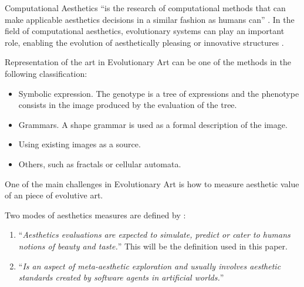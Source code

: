 \documentclass[conference]{IEEEtran}
\begin{document}
Computational Aesthetics ``is the research of computational methods that can make applicable aesthetics decisions in a similar fashion as humans can'' \cite{COMPAESTH}. In the field of computational aesthetics, evolutionary systems can play an important role, enabling the evolution of aesthetically pleasing or innovative structures \cite{dipaola2009incorporating}.


Representation of the art in Evolutionary Art can be one of the methods in the following classification:
\begin{itemize}
	\item Symbolic expression. The genotype is a tree of expressions and the phenotype consists in the image produced  by the evaluation of the tree.
	\item Grammars. A shape grammar is used as a formal description of the image.
	\item Using existing images as a source. 
	\item Others, such as fractals or cellular automata.
\end{itemize}

One of the main challenges in Evolutionary Art is how to measure aesthetic value of an piece of evolutive art.

Two modes of aesthetics measures are defined by \cite{galanter2012computational}: 
\begin{enumerate}
\item ``{\em Aesthetics evaluations are expected to simulate, predict or cater to humans notions of beauty and taste.}'' This will be the definition used in this paper. 
\item ``{\em Is an aspect of meta-aesthetic exploration and usually involves aesthetic standards created by software agents in artificial worlds.}''
\end{enumerate}
\end{document}

